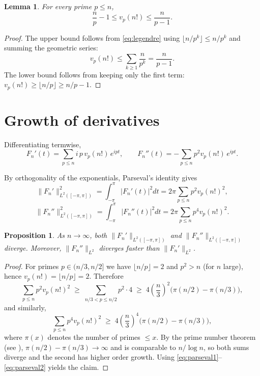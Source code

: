 \documentclass[11pt]{article}
\theoremstyle{plain}
\newtheorem{lemma}[theorem]{Lemma}
\newtheorem{proposition}[theorem]{Proposition}
\begin{document}
\begin{lemma}\label{lem:vp-bounds}
For every prime $p\le n$,
\[
\frac{n}{p}-1 \le v_p(n!) \le \frac{n}{p-1}.
\]
\end{lemma}

\begin{proof}
The upper bound follows from \eqref{eq:legendre} using $\lfloor n/p^k\rfloor\le n/p^k$ and summing the geometric series:
\[
v_p(n!)\le \sum_{k\ge1}\frac{n}{p^k}=\frac{n}{p-1}.
\]
The lower bound follows from keeping only the first term:
$v_p(n!)\ge \lfloor n/p\rfloor\ge n/p-1$.
\end{proof}

\section{Growth of derivatives}

Differentiating termwise,
\[
F_n'(t)=\sum_{p\le n} i\,p\,v_p(n!)\, e^{i p t},
\qquad
F_n''(t)=-\sum_{p\le n} p^2 v_p(n!)\, e^{i p t}.
\]

By orthogonality of the exponentials, Parseval's identity gives
\begin{equation}\label{eq:parseval1}
\|F_n'\|_{L^2([-\pi,\pi])}^2
=
\int_{-\pi}^{\pi}|F_n'(t)|^2 dt
=2\pi\sum_{p\le n} p^2 v_p(n!)^2,
\end{equation}
\begin{equation}\label{eq:parseval2}
\|F_n''\|_{L^2([-\pi,\pi])}^2
=
\int_{-\pi}^{\pi}|F_n''(t)|^2 dt
=2\pi\sum_{p\le n} p^4 v_p(n!)^2.
\end{equation}

\begin{proposition}\label{prop:l2-diverge}
As $n\to\infty$, both $\|F_n'\|_{L^2([-\pi,\pi])}$ and $\|F_n''\|_{L^2([-\pi,\pi])}$ diverge.
Moreover, $\|F_n''\|_{L^2}$ diverges faster than $\|F_n'\|_{L^2}$.
\end{proposition}

\begin{proof}
For primes $p\in(n/3,n/2]$ we have $\lfloor n/p\rfloor=2$ and $p^2>n$ (for $n$ large), hence $v_p(n!)=\lfloor n/p\rfloor=2$.
Therefore
\[
\sum_{p\le n} p^2 v_p(n!)^2
\;\ge\;
\sum_{n/3<p\le n/2} p^2\cdot 4
\;\ge\;
4\left(\frac{n}{3}\right)^2\big(\pi(n/2)-\pi(n/3)\big),
\]
and similarly,
\[
\sum_{p\le n} p^4 v_p(n!)^2
\;\ge\;
4\left(\frac{n}{3}\right)^4\big(\pi(n/2)-\pi(n/3)\big),
\]
where $\pi(x)$ denotes the number of primes $\le x$.
By the prime number theorem (see \cite{Montgomery1994}), $\pi(n/2)-\pi(n/3)\to\infty$ and is comparable to $n/\log n$, so both sums diverge and the second has higher order growth.
Using \eqref{eq:parseval1}--\eqref{eq:parseval2} yields the claim.
\end{proof}
\end{document}
